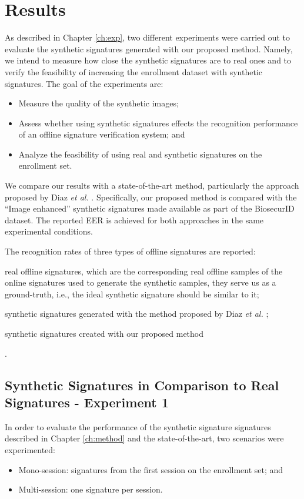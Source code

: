 
\chapter{Results} \label{ch:results}

As described in Chapter \ref{ch:exp}, two different experiments were
carried out to evaluate the synthetic signatures generated with our proposed method. Namely, we intend to measure how close the synthetic signatures are to real ones and to verify the feasibility of increasing the enrollment dataset with synthetic signatures. The goal of the experiments are:
\begin{itemize}
  \item Measure the quality of the synthetic images;
  \item Assess whether using synthetic signatures effects the recognition performance of an offline signature verification system; and
  \item Analyze the feasibility of using real and synthetic signatures
  on the enrollment set.
\end{itemize}

We compare our results with a state-of-the-art method, particularly the approach proposed by Diaz \textit{et al.} \cite{diaz2014generation}. Specifically, our proposed method is compared with the ``Image enhanced'' synthetic signatures made available as part of the BiosecurID \cite{biosecurid} dataset. The reported EER is achieved for both approaches in the same experimental conditions.

The recognition rates of three types of offline signatures are reported: 
\begin{inlinelist}
  \item real offline signatures, which are the corresponding real offline samples of the online signatures used to generate the synthetic samples, they serve us as a ground-truth, i.e., the ideal synthetic signature should be similar to it;
  \item synthetic signatures generated with the method proposed by Diaz \textit{et al.} \cite{diaz2014generation};
  \item synthetic signatures created with our proposed method
\end{inlinelist}.

\section{Synthetic Signatures in Comparison to Real Signatures - Experiment 1}
In order to evaluate the performance of the synthetic signature signatures described in Chapter \ref{ch:method} and the state-of-the-art, two scenarios were experimented: 
\begin{itemize}
\item Mono-session: signatures from the first session on the enrollment set; and
\item Multi-session: one signature per session.
\end{itemize}


